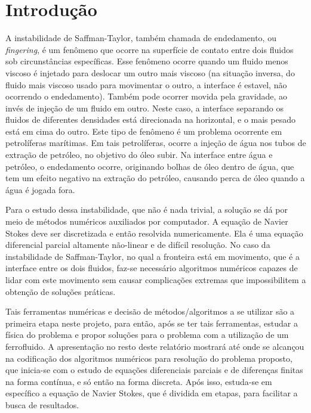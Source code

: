 \documentclass[journal]{IEEEtran}
\begin{document}
\section{Introdução}
A instabilidade de Saffman-Taylor, também chamada de endedamento, ou \textit{fingering}, é um fenômeno que ocorre na superfície de contato entre dois fluidos sob circunstâncias específicas. Esse fenômeno ocorre quando um fluido menos viscoso é injetado para deslocar um outro mais viscoso (na situação inversa, do fluido mais viscoso usado para movimentar o outro, a interface é estavel, não ocorrendo o endedamento). Também pode ocorrer movida pela gravidade, ao invés de injeção de um fluido em outro. Neste caso, a interface separando os fluidos de diferentes densidades está direcionada na horizontal, e o mais pesado está em cima do outro. Este tipo de fenômeno é um problema ocorrente em petrolíferas marítimas. Em tais petrolíferas, ocorre a injeção de água nos tubos de extração de petróleo, no objetivo do óleo subir. Na interface entre água e petróleo, o endedamento ocorre, originando bolhas de óleo dentro de água, que tem um efeito negativo na extração do petróleo, causando perca de óleo quando a água é jogada fora.

Para o estudo dessa instabilidade, que não é nada trivial, a solução se dá por meio de métodos numéricos auxiliados por computador. A equação de Navier Stokes deve ser discretizada e então resolvida numericamente. Ela é uma equação diferencial parcial altamente não-linear e de difícil resolução. No caso da instabilidade de Saffman-Taylor, no qual a fronteira está em movimento, que é a interface entre os dois fluidos, faz-se necessário algoritmos numéricos capazes de lidar com este movimento sem causar complicações extremas que impossibilitem a obtenção de soluções práticas. 

Tais ferramentas numéricas e decisão de métodos/algoritmos a se utilizar são a primeira etapa neste projeto, para então, após se ter tais ferramentas, estudar a física do problema e propor soluções para o problema com a utilização de um ferrofluido. A apresentação no resto deste relatório mostrará até onde se alcançou na codificação dos algoritmos numéricos para resolução do problema proposto, que inicia-se com o estudo de equações diferenciais parciais e de diferenças finitas na forma contínua, e só então na forma discreta. Após isso, estuda-se em específico a equação de Navier Stokes, que é dividida em etapas, para facilitar a busca de resultados.
\end{document}
